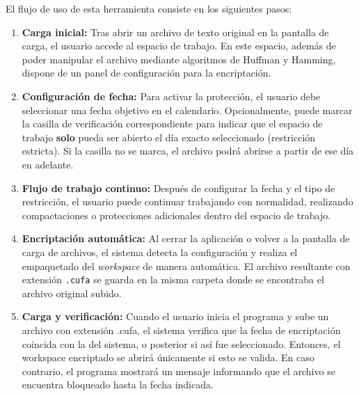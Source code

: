 El flujo de uso de esta herramienta consiste en los siguientes pasos:
\begin{enumerate}
    \item \textbf{Carga inicial:} Tras abrir un archivo de texto original en la pantalla de carga, el usuario accede al espacio de trabajo. En este espacio, además de poder manipular el archivo mediante algoritmos de Huffman y Hamming, dispone de un panel de configuración para la encriptación.
    \item \textbf{Configuración de fecha:} Para activar la protección, el usuario debe seleccionar una fecha objetivo en el calendario. Opcionalmente, puede marcar la casilla de verificación correspondiente para indicar que el espacio de trabajo \textbf{solo} pueda ser abierto el día exacto seleccionado (restricción estricta). Si la casilla no se marca, el archivo podrá abrirse a partir de ese día en adelante.
    \item \textbf{Flujo de trabajo continuo:} Después de configurar la fecha y el tipo de restricción, el usuario puede continuar trabajando con normalidad, realizando compactaciones o protecciones adicionales dentro del espacio de trabajo.
    \item \textbf{Encriptación automática:} Al cerrar la aplicación o volver a la pantalla de carga de archivos, el sistema detecta la configuración y realiza el empaquetado del \textit{workspace} de manera automática. El archivo resultante con extensión \texttt{.cufa} se guarda en la misma carpeta donde se encontraba el archivo original subido.
    \item \textbf{Carga y verificación:} Cuando el usuario inicia el programa y sube un archivo con extensión .cufa, el sistema verifica que la fecha de encriptación coincida con la del sistema, o posterior si así fue seleccionado. Entonces, el workspace encriptado se abrirá únicamente si esto se valida. En caso contrario, el programa mostrará un mensaje informando que el archivo se encuentra bloqueado hasta la fecha indicada.
\end{enumerate}
